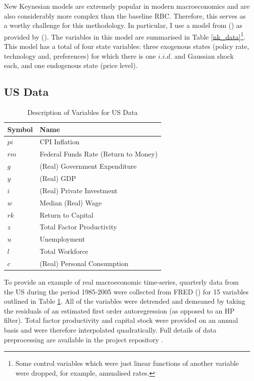 \documentclass{article}
\begin{document}
New Keynesian models are extremely popular in modern macroeconomics and are also considerably more complex than the baseline RBC. Therefore, this serves as a worthy challenge for this methodology. In particular, I use a model from \citeauthor{gali2015monetary} (\citeyear{gali2015monetary}) as provided by \citeauthor{pfeifer2020} (\citeyear{pfeifer2020}). The variables in this model are summarised in Table \ref{nk_data}\footnote{Some control variables which were just linear functions of another variable were dropped, for example, annualised rates.}. This model has a total of four state variables: three exogenous states (policy rate, technology and, preferences) for which there is one $i.i.d.$ and Gaussian shock each, and one endogenous state (price level).

\subsection{US Data}

\begin{table}
  \centering
  \begin{tabular}{|l|l|}
    \hline
    Symbol & Name \\
    \hline
    $pi$ & CPI Inflation \\
    $rm$ & Federal Funds Rate (Return to Money) \\
    $g$ & (Real) Government Expenditure \\
    $y$ & (Real) GDP \\
    $i$ & (Real) Private Investment \\
    $w$ & Median (Real) Wage \\
    $rk$ & Return to Capital \\
    $z$ & Total Factor Productivity \\
    $u$ & Unemployment \\
    $l$ & Total Workforce \\
    $c$ & (Real) Personal Consumption \\\cline{2-2}
    \hline
  \end{tabular}
  \caption{Description of Variables for US Data}
  \label{tab3}
\end{table}

To provide an example of real macroeconomic time-series, quarterly data from the US during the period 1985-2005 were collected from FRED (\citeyear{fred2020data}) for 15 variables outlined in Table \ref{tab3}. All of the variables were detrended and demeaned by taking the residuals of an estimated first order autoregression (as opposed to an HP filter). Total factor productivity and capital stock were provided on an annual basis and were therefore interpolated quadratically. Full details of data preprocessing are available in the project repository \parencite{hall2020git}.
\end{document}
